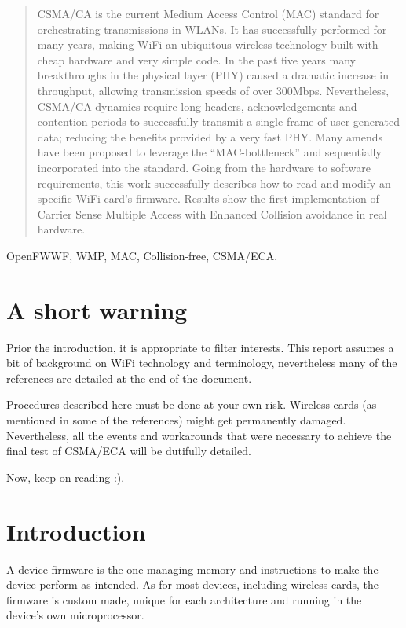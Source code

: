 \documentclass[conference]{IEEEtran}
\begin{document}
\begin{abstract}

\boldmath CSMA/CA is the current Medium Access Control (MAC) standard for orchestrating transmissions in WLANs. It has successfully performed for many years, making WiFi an ubiquitous wireless technology built with cheap hardware and very simple code. In the past five years many breakthroughs in the physical layer (PHY) caused a dramatic increase in throughput, allowing transmission speeds of over 300Mbps. Nevertheless, CSMA/CA dynamics require long headers, acknowledgements and contention periods to successfully transmit a single frame of user-generated data; reducing the benefits provided by a very fast PHY. Many amends have been proposed to leverage the ``MAC-bottleneck'' and sequentially incorporated into the standard. Going from the hardware to software requirements, this work successfully describes how to read and modify an specific WiFi card's firmware. Results show the first implementation of Carrier Sense Multiple Access with Enhanced Collision avoidance in real hardware.

\end{abstract}

\begin{IEEEkeywords}
OpenFWWF, WMP, MAC, Collision-free, CSMA/ECA.
\end{IEEEkeywords}

\section*{A short warning} \label{warning}
Prior the introduction, it is appropriate to filter interests. This report assumes a bit of background on WiFi technology and terminology, nevertheless many of the references are detailed at the end of the document.

Procedures described here must be done at your own risk. Wireless cards (as mentioned in some of the references) might get permanently damaged. Nevertheless, all the events and workarounds that were necessary to achieve the final test of CSMA/ECA will be dutifully detailed.

Now, keep on reading :).

\section{Introduction}\label{introduction}
A device firmware is the one managing memory and instructions to make the device perform as intended. As for most devices, including wireless cards, the firmware is custom made, unique for each architecture and running in the device's own microprocessor.
\end{document}
